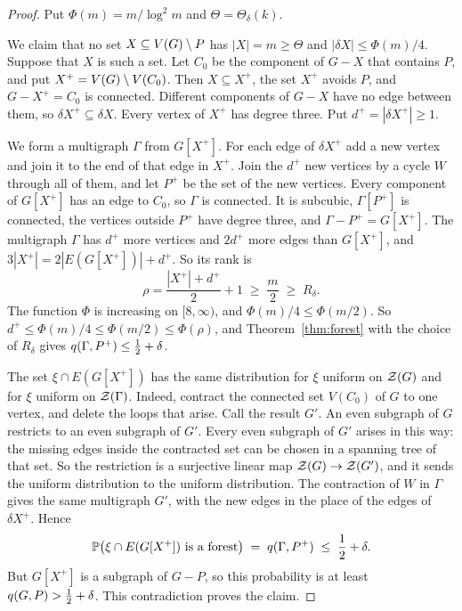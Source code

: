 \begin{proof}
Put $\Phi(m)=m/\log^{2}m$ and $\Theta=\Theta_\delta(k)$.

 We claim that no set
$X\subseteq V(G)\setminus P$ has $|X|=m\ge\Theta$ and $|\delta X|\le\Phi(m)/4$. Suppose that $X$ is such a
set. Let $C_0$ be the component of $G-X$ that contains $P$, and put $X^{+}=V(G)\setminus V(C_0)$. Then
$X\subseteq X^{+}$, the set $X^{+}$ avoids $P$, and $G-X^{+}=C_0$ is connected. Different components
of $G-X$ have no edge between them, so $\delta X^{+}\subseteq\delta X$. Every vertex of $X^{+}$ has
degree three. Put $d^{+}=|\delta X^{+}|\ge1$.

We form a multigraph $\Gamma$ from $G[X^{+}]$. For each edge of $\delta X^{+}$ add a new vertex
and join it to the end of that edge in $X^{+}$. Join the $d^{+}$ new vertices by a cycle $W$
through all of them, and let $P^{+}$ be the set of the new vertices. Every component of
$G[X^{+}]$ has an edge to $C_0$, so $\Gamma$ is connected. It is subcubic, $\Gamma[P^{+}]$ is
connected, the vertices outside $P^{+}$ have degree three, and $\Gamma-P^{+}=G[X^{+}]$. The
multigraph $\Gamma$ has $d^{+}$ more vertices and $2d^{+}$ more edges than $G[X^{+}]$, and
$3|X^{+}|=2|E(G[X^{+}])|+d^{+}$. So its rank is
\[
  \rho=\frac{|X^{+}|+d^{+}}2+1\;\ge\;\frac m2\;\ge\;R_\delta .
\]
The function $\Phi$ is increasing on $[8,\infty)$, and $\Phi(m)/4\le\Phi(m/2)$. So
$d^{+}\le\Phi(m)/4\le\Phi(m/2)\le\Phi(\rho)$, and Theorem~\ref{thm:forest} with the choice of
$R_\delta$ gives $q(\Gamma,P^{+})\le\tfrac12+\delta$.

The set $\xi\cap E(G[X^{+}])$ has the same distribution for $\xi$ uniform on $\mathcal{Z}(G)$ and for
$\xi$ uniform on $\mathcal{Z}(\Gamma)$. Indeed, contract the connected set $V(C_0)$ of $G$ to one vertex,
and delete the loops that arise. Call the result $G'$. An even subgraph of $G$ restricts to an
even subgraph of $G'$. Every even subgraph of $G'$ arises in this way: the missing edges inside
the contracted set can be chosen in a spanning tree of that set. So the restriction is a
surjective linear map $\mathcal{Z}(G)\to\mathcal{Z}(G')$, and it sends the uniform distribution to the uniform
distribution. The contraction of $W$ in $\Gamma$ gives the same multigraph $G'$, with the new
edges in the place of the edges of $\delta X^{+}$. Hence
\[
  \mathbb{P}\bigl(\xi\cap E(G[X^{+}])\text{ is a forest}\bigr)\;=\;q(\Gamma,P^{+})\;\le\;\frac12+\delta .
\]
But $G[X^{+}]$ is a subgraph of $G-P$, so this probability is at least $q(G,P)>\tfrac12+\delta$. This
contradiction proves the claim.


\end{proof}
